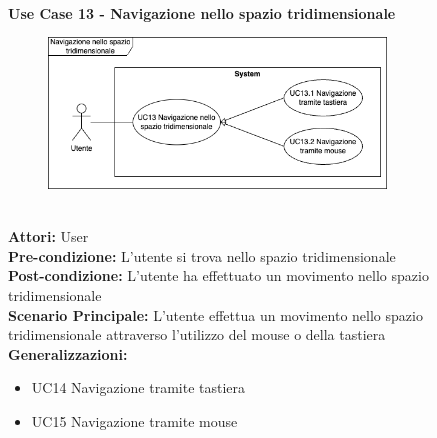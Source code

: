 \Large\textbf{}\\
\Large\textbf{Use Case 13 - Navigazione nello spazio tridimensionale} \\
\vspace{0.5cm}
\begin{figure}[h]
 \centering
 \includegraphics[width=0.8\textwidth]{UseCasesImages/Navigation.png}
\end{figure}
\large\textbf{} \\
\textbf{Attori:} User\\
\textbf{Pre-condizione:} L'utente si trova nello spazio tridimensionale\\
\textbf{Post-condizione: } L'utente ha effettuato un movimento nello spazio tridimensionale\\
\textbf{Scenario Principale:} L'utente effettua un movimento nello spazio tridimensionale attraverso l'utilizzo del mouse o della tastiera\\
\textbf{Generalizzazioni:} 
\begin{itemize}
    \item UC14 Navigazione tramite tastiera
    \item UC15 Navigazione tramite mouse
\end{itemize}
\vspace{0.5cm}